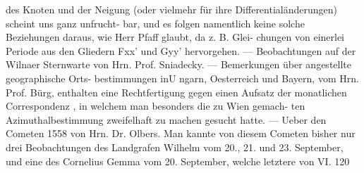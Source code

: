 \documentclass[12pt,a4paper]{article}
\begin{document}
des Knoten und der Neigung (oder vielmehr für ihre Differentialänderungen) scheint uns ganz unfrucht-\newline
bar, und es folgen namentlich keine solche Beziehungen daraus, wie Herr Pfaff glaubt, da z. B. Glei-\newline
chungen von einerlei Periode aus den Gliedern Fxx' und Gyy' hervorgehen. --- Beobachtungen auf\newline
der Wilnaer Sternwarte von Hrn. Prof. Sniadecky. --- Bemerkungen über angestellte geographische Orts-\newline
bestimmungen inU ngarn, Oesterreich und Bayern, vom Hrn. Prof. Bürg, enthalten eine Rechtfertigung\newline
gegen einen Aufsatz der monatlichen Correspondenz , in welchem man besonders die zu Wien gemach-\newline
ten Azimuthalbestimmung zweifelhaft zu machen gesucht hatte. --- Ueber den Cometen 1558 von Hrn.\newline
Dr. Olbers. Man kannte von diesem Cometen bisher nur drei Beobachtungen des Landgrafen Wilhelm\newline
vom 20., 21. und 23. September, und eine des Cornelius Gemma vom 20. September, welche letztere von\newline
VI. 120\newline
\end{document}
